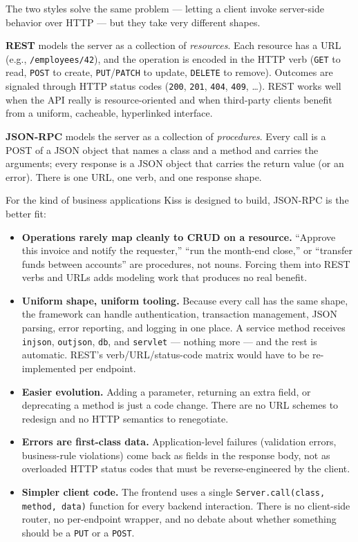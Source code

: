 The two styles solve the same problem --- letting a client invoke server-side behavior over HTTP --- but they take very different shapes.

\textbf{REST} models the server as a collection of \emph{resources}.  Each resource has a URL (e.g., \texttt{/employees/42}), and the operation is encoded in the HTTP verb (\texttt{GET} to read, \texttt{POST} to create, \texttt{PUT}/\texttt{PATCH} to update, \texttt{DELETE} to remove).  Outcomes are signaled through HTTP status codes (\texttt{200}, \texttt{201}, \texttt{404}, \texttt{409}, \ldots).  REST works well when the API really is resource-oriented and when third-party clients benefit from a uniform, cacheable, hyperlinked interface.

\textbf{JSON-RPC} models the server as a collection of \emph{procedures}.  Every call is a POST of a JSON object that names a class and a method and carries the arguments; every response is a JSON object that carries the return value (or an error).  There is one URL, one verb, and one response shape.

For the kind of business applications Kiss is designed to build, JSON-RPC is the better fit:

\begin{itemize}
  \item \textbf{Operations rarely map cleanly to CRUD on a resource.}  ``Approve this invoice and notify the requester,'' ``run the month-end close,'' or ``transfer funds between accounts'' are procedures, not nouns.  Forcing them into REST verbs and URLs adds modeling work that produces no real benefit.

  \item \textbf{Uniform shape, uniform tooling.}  Because every call has the same shape, the framework can handle authentication, transaction management, JSON parsing, error reporting, and logging in one place.  A service method receives \texttt{injson}, \texttt{outjson}, \texttt{db}, and \texttt{servlet} --- nothing more --- and the rest is automatic.  REST's verb/URL/status-code matrix would have to be re-implemented per endpoint.

  \item \textbf{Easier evolution.}  Adding a parameter, returning an extra field, or deprecating a method is just a code change.  There are no URL schemes to redesign and no HTTP semantics to renegotiate.

  \item \textbf{Errors are first-class data.}  Application-level failures (validation errors, business-rule violations) come back as fields in the response body, not as overloaded HTTP status codes that must be reverse-engineered by the client.

  \item \textbf{Simpler client code.}  The frontend uses a single \texttt{Server.call(class, method, data)} function for every backend interaction.  There is no client-side router, no per-endpoint wrapper, and no debate about whether something should be a \texttt{PUT} or a \texttt{POST}.
\end{itemize}

